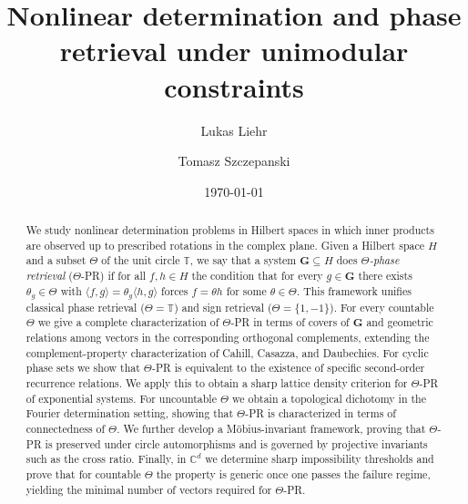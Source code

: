 \documentclass[reqno,a4paper,11pt]{amsart}
\numberwithin{equation}{section}
\newcommand\1{\mathds{1}}
\begin{document}
\title[Nonlinear determination under unimodular constraints]{Nonlinear determination and phase retrieval under unimodular constraints}

\author[Lukas Liehr]{Lukas Liehr}
\address{Department of Mathematics, Bar-Ilan University, Ramat-Gan 5290002, Israel}

\author[Tomasz Szczepanski]{Tomasz Szczepanski}
\address{Department of Mathematical and Statistical Sciences, University of Alberta, Edmonton, AB, Canada, T6G 2G1}

\date{\today}

\begin{abstract}
We study nonlinear determination problems in Hilbert spaces in which inner products are observed up to prescribed rotations in the complex plane. Given a Hilbert space $H$ and a subset $\Theta$ of the unit circle $\mathbb{T}$, we say that a system $\mathbf{G}\subseteq H$ does \emph{$\Theta$-phase retrieval} ($\Theta$-PR) if for all $f,h\in H$ the condition that for every $g\in\mathbf{G}$ there exists $\theta_g\in\Theta$ with $\langle f,g\rangle=\theta_g\langle h,g\rangle$ forces $f=\theta h$ for some $\theta\in\Theta$. This framework unifies classical phase retrieval ($\Theta=\mathbb{T}$) and sign retrieval ($\Theta=\{1,-1\}$).
For every countable $\Theta$ we give a complete characterization of $\Theta$-PR in terms of covers of $\mathbf{G}$ and geometric relations among vectors in the corresponding orthogonal complements, extending the complement-property characterization of Cahill, Casazza, and Daubechies. For cyclic phase sets we show that $\Theta$-PR is equivalent to the existence of specific second-order recurrence relations. We apply this to obtain a sharp lattice density criterion for $\Theta$-PR of exponential systems.
For uncountable $\Theta$ we obtain a topological dichotomy in the Fourier determination setting, showing that $\Theta$-PR is characterized in terms of connectedness of $\Theta$.
We further develop a Möbius-invariant framework, proving that $\Theta$-PR is preserved under circle automorphisms and is governed by projective invariants such as the cross ratio. Finally, in $\mathbb{C}^d$ we determine sharp impossibility thresholds and prove that for countable $\Theta$ the property is generic once one passes the failure regime, yielding the minimal number of vectors required for $\Theta$-PR.
\end{abstract}
\end{document}
